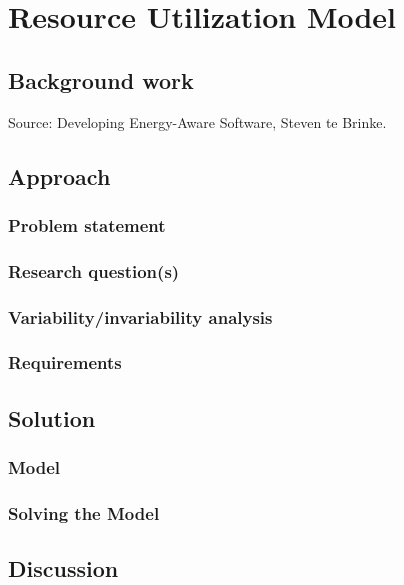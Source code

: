 \chapter{Resource Utilization Model}
\section{Background work}
Source: Developing Energy-Aware Software, Steven te Brinke.
\section{Approach}
\subsection{Problem statement}
\subsection{Research question(s)}
\subsection{Variability/invariability analysis}
\subsection{Requirements}
\section{Solution}
\subsection{Model}
\subsection{Solving the Model}
\section{Discussion}









